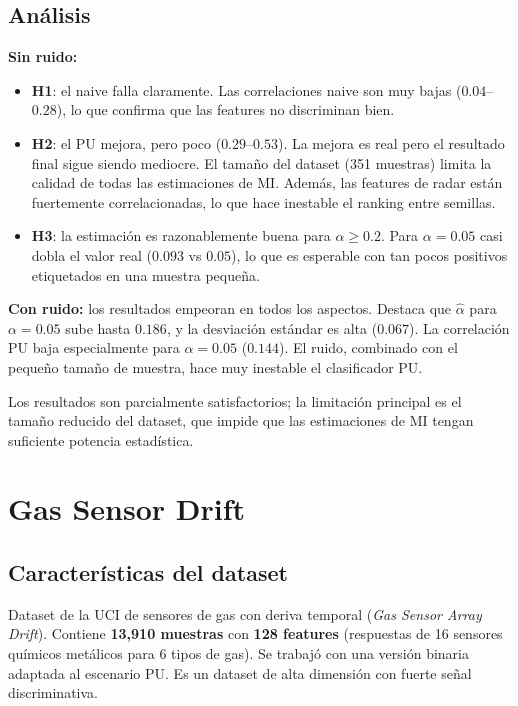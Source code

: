 \documentclass[a4paper,11pt]{article}
\begin{document}
\subsection{Análisis}

\textbf{Sin ruido:}
\begin{itemize}
    \item \textbf{H1}: el naive falla claramente. Las correlaciones naive son muy bajas ($0.04$--$0.28$), lo que confirma que las features no discriminan bien.
    \item \textbf{H2}: el PU mejora, pero poco ($0.29$--$0.53$). La mejora es real pero el resultado final sigue siendo mediocre. El tamaño del dataset (351 muestras) limita la calidad de todas las estimaciones de MI. Además, las features de radar están fuertemente correlacionadas, lo que hace inestable el ranking entre semillas.
    \item \textbf{H3}: la estimación es razonablemente buena para $\alpha \geq 0.2$. Para $\alpha = 0.05$ casi dobla el valor real ($0.093$ vs $0.05$), lo que es esperable con tan pocos positivos etiquetados en una muestra pequeña.
\end{itemize}

\textbf{Con ruido:} los resultados empeoran en todos los aspectos. Destaca que $\hat{\alpha}$ para $\alpha = 0.05$ sube hasta $0.186$, y la desviación estándar es alta ($0.067$). La correlación PU baja especialmente para $\alpha=0.05$ ($0.144$). El ruido, combinado con el pequeño tamaño de muestra, hace muy inestable el clasificador PU.

Los resultados son parcialmente satisfactorios; la limitación principal es el tamaño reducido del dataset, que impide que las estimaciones de MI tengan suficiente potencia estadística.

\section{Gas Sensor Drift}

\subsection{Características del dataset}

Dataset de la UCI de sensores de gas con deriva temporal (\textit{Gas Sensor Array Drift}). Contiene \textbf{13{,}910 muestras} con \textbf{128 features} (respuestas de 16 sensores químicos metálicos para 6 tipos de gas). Se trabajó con una versión binaria adaptada al escenario PU. Es un dataset de alta dimensión con fuerte señal discriminativa.
\end{document}
